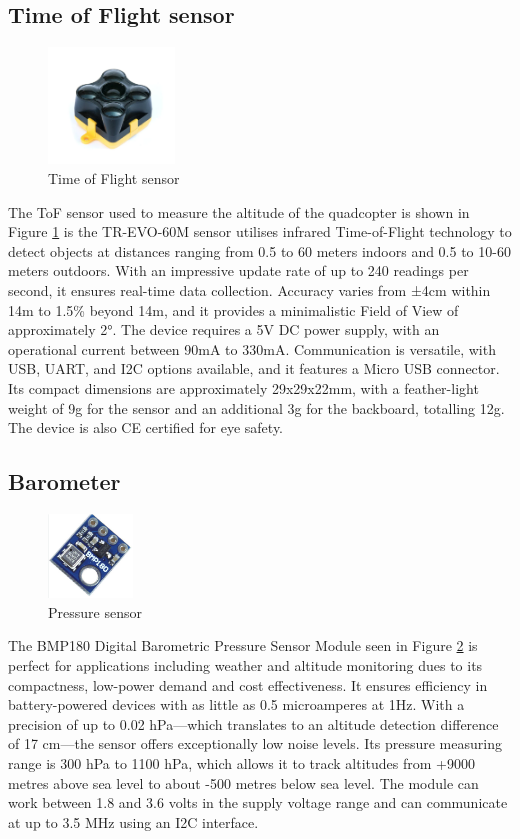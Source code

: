 \documentclass{report}
\begin{document}
\subsection{Time of Flight sensor}
\begin{figure}[H]
  \centering
  \includegraphics[width=0.3\textwidth]{Pictures/ToF_sensor.png}
  \caption{Time of Flight sensor}
  \label{fig:ToF}
\end{figure}
The ToF sensor used to measure the altitude of the quadcopter is shown in Figure
\ref{fig:ToF} is the TR-EVO-60M sensor utilises infrared Time-of-Flight
technology to detect objects at distances ranging from 0.5 to 60 meters indoors
and 0.5 to 10-60 meters outdoors. With an impressive update rate of up to 240
readings per second, it ensures real-time data collection. Accuracy varies from
±4cm within 14m to 1.5\% beyond 14m, and it provides a minimalistic Field of
View of approximately 2°. The device requires a 5V DC power supply, with an
operational current between 90mA to 330mA. Communication is versatile, with USB,
UART, and I2C options available, and it features a Micro USB connector. Its
compact dimensions are approximately 29x29x22mm, with a feather-light weight of
9g for the sensor and an additional 3g for the backboard, totalling 12g. The
device is also CE certified for eye safety.

\subsection{Barometer}
\begin{figure}[H]
  \centering
  \includegraphics[width=0.2\textwidth]{Pictures/bmp180.png}
  \caption{Pressure sensor}
  \label{fig:bmp180}
\end{figure}
The BMP180 Digital Barometric Pressure Sensor Module seen in Figure
\ref{fig:bmp180} is perfect for applications including weather and altitude
monitoring dues to its compactness, low-power demand and cost effectiveness. It
ensures efficiency in battery-powered devices with as little as 0.5 microamperes
at 1Hz. With a precision of up to 0.02 hPa—which translates to an altitude
detection difference of 17 cm—the sensor offers exceptionally low noise levels.
Its pressure measuring range is 300 hPa to 1100 hPa, which allows it to track
altitudes from +9000 metres above sea level to about -500 metres below sea
level. The module can work between 1.8 and 3.6 volts in the supply voltage range
and can communicate at up to 3.5 MHz using an I2C interface.
\end{document}
